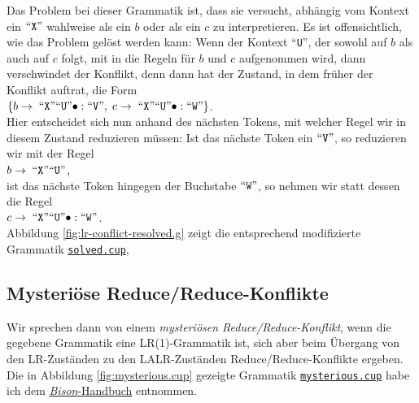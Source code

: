 Das Problem bei dieser Grammatik ist, dass sie versucht, abh\"angig vom Kontext ein $\mbox{``\texttt{X}''}$ wahlweise
als ein $b$ oder als ein $c$ zu interpretieren.  Es ist offensichtlich, wie das Problem gel\"ost werden
kann:  Wenn der Kontext ``\texttt{U}'', der sowohl auf $b$ als auch auf $c$ folgt, mit in
die Regeln f\"ur $b$ und $c$ aufgenommen wird, dann verschwindet der Konflikt, denn dann hat der
Zustand, in dem fr\"uher der Konflikt auftrat, die Form
\\[0.2cm]
\hspace*{1.3cm}
$\{ b \rightarrow \;\mbox{``\texttt{X}''} \mbox{``\texttt{U}''}\bullet: \mbox{``\texttt{V}''},\; 
    c \rightarrow \;\mbox{``\texttt{X}''} \mbox{``\texttt{U}''}\bullet: \mbox{``\texttt{W}''} 
\}
$.
\\[0.2cm]  
Hier entscheidet sich nun anhand des n\"achsten Tokens, mit welcher Regel wir in diesem Zustand
reduzieren m\"ussen:  Ist das n\"achste Token ein $\mbox{``\texttt{V}''}$, so reduzieren wir mit der Regel
\\[0.2cm]
\hspace*{1.3cm}
$b \rightarrow \;\mbox{``\texttt{X}''} \mbox{``\texttt{U}''}$,
\\[0.2cm]
ist das n\"achste Token hingegen der Buchstabe $\mbox{``\texttt{W}''}$, so nehmen wir statt dessen die Regel
\\[0.2cm]
\hspace*{1.3cm}
$c \rightarrow \;\mbox{``\texttt{X}''} \mbox{``\texttt{U}''}\bullet: \mbox{``\texttt{W}''}$.
\\[0.2cm]
Abbildung
\ref{fig:lr-conflict-resolved.g} zeigt die entsprechend modifizierte Grammatik
\href{https://github.com/karlstroetmann/Formal-Languages/tree/master/Cup/LookAheadConflict/solved.cup}{\texttt{solved.cup}},

\subsection{Mysteri\"ose Reduce/Reduce-Konflikte}
Wir sprechen dann von einem \emph{mysteri\"osen Reduce/Reduce-Konflikt}, wenn die gegebene Grammatik eine
LR(1)-Grammatik ist, sich aber beim \"Ubergang von den LR-Zust\"anden zu den LALR-Zust\"anden Reduce/Reduce-Konflikte
ergeben.  Die in Abbildung \ref{fig:mysterious.cup} gezeigte Grammatik 
\href{https://github.com/karlstroetmann/Formal-Languages/tree/master/Cup/MysteriousConflict/mysterious.cup}{\texttt{mysterious.cup}}
habe ich dem 
\href{http://www.gnu.org/software/bison/manual/}{\textsl{Bison}-Handbuch} entnommen. 



